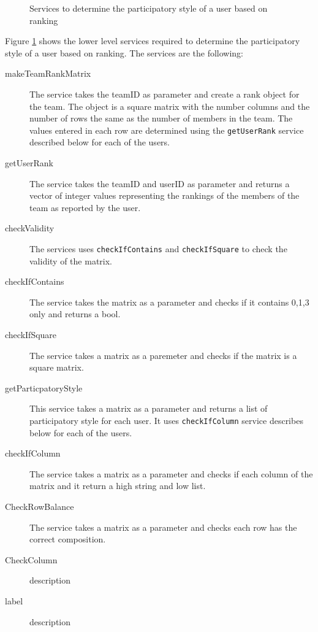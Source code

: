 \begin{figure}[htb]
\begin{center}
\end{center}
\caption{Services to determine the participatory style of a user based on ranking \label{fig:rank_functionalRequirements}}
\end{figure}

Figure \ref{fig:rank_functionalRequirements} shows the lower level services required to determine the participatory style of a user based on ranking. The services are the following:

\begin{description}

\item[makeTeamRankMatrix] The service takes the teamID as parameter and create a rank object for the team. The object is a square matrix with the number columns and the number of rows the same as the number of members in the team. The values entered in each row are determined using the \texttt{getUserRank} service described below for each of the users. 

\item[getUserRank] The service takes the teamID and userID as parameter and returns a vector of integer values representing the rankings of the members of the team as reported by the user. 

\item[checkValidity] The services uses \texttt{checkIfContains} and \texttt{checkIfSquare} to check the validity of the matrix.

\item[checkIfContains] The service takes the matrix as a parameter and checks if it contains 0,1,3 only and returns a bool.

\item[checkIfSquare] The service takes a matrix as a paremeter and checks if the matrix is a square matrix.

\item[getParticpatoryStyle] This service takes a matrix as a parameter and returns a list of participatory style for each user. It uses \texttt{checkIfColumn} service describes below for each of the users.

\item[checkIfColumn] The service takes a matrix as a parameter and checks if each column of the matrix and it return a high string and low list.

\item[CheckRowBalance] The service takes a matrix as a parameter and checks each row has the correct composition. 

\item[CheckColumn] description

\item[label] description
\end{description}  









